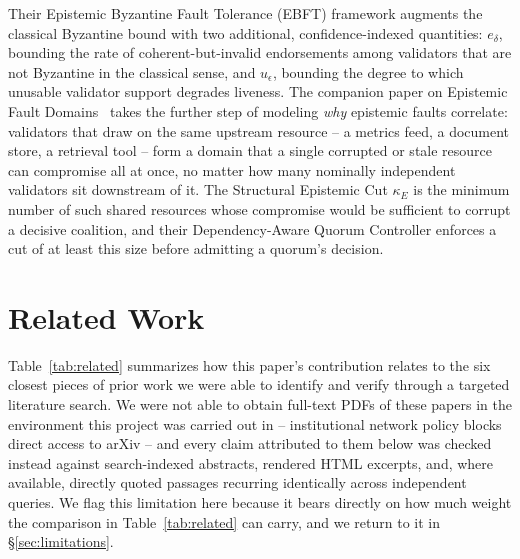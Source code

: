 \documentclass[journal]{IEEEtran}
\begin{document}
Their Epistemic Byzantine Fault Tolerance (EBFT) framework augments the classical Byzantine bound with two additional, confidence-indexed quantities: $e_\delta$, bounding the rate of coherent-but-invalid endorsements among validators that are not Byzantine in the classical sense, and $u_\epsilon$, bounding the degree to which unusable validator support degrades liveness. The companion paper on Epistemic Fault Domains~\cite{he2026illusion} takes the further step of modeling \emph{why} epistemic faults correlate: validators that draw on the same upstream resource -- a metrics feed, a document store, a retrieval tool -- form a domain that a single corrupted or stale resource can compromise all at once, no matter how many nominally independent validators sit downstream of it. The Structural Epistemic Cut $\kappa_E$ is the minimum number of such shared resources whose compromise would be sufficient to corrupt a decisive coalition, and their Dependency-Aware Quorum Controller enforces a cut of at least this size before admitting a quorum's decision.

\section{Related Work}
\label{sec:related}

Table~\ref{tab:related} summarizes how this paper's contribution relates to the six closest pieces of prior work we were able to identify and verify through a targeted literature search. We were not able to obtain full-text PDFs of these papers in the environment this project was carried out in -- institutional network policy blocks direct access to arXiv -- and every claim attributed to them below was checked instead against search-indexed abstracts, rendered HTML excerpts, and, where available, directly quoted passages recurring identically across independent queries. We flag this limitation here because it bears directly on how much weight the comparison in Table~\ref{tab:related} can carry, and we return to it in \S\ref{sec:limitations}.
\end{document}
